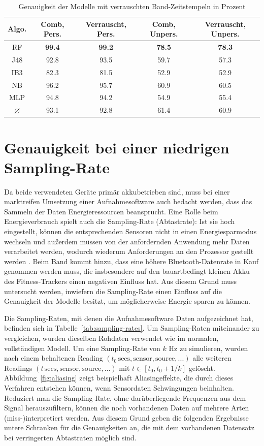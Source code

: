 \begin{table}
\centering
\begin{tabular}{|c|c|c||c|c|}
	\hline 
	\textbf{Algo.} & \textbf{Comb, Pers.} & \textbf{Verrauscht, Pers.} &\textbf{Comb, Unpers.} & \textbf{Verrauscht, Unpers.} \\ 
	\hline 
	\acs{RF} & \textbf{99.4} & \textbf{99.2} & \textbf{78.5} & \textbf{78.3} \\ 
	\acs{J48} & 92.8 & 93.5 & 59.7 & 57.3 \\ 
	\acs{IB}3 & 82.3 & 81.5 & 52.9 & 52.9 \\ 
	\acs{NB} & 96.2 & 95.7 & 60.9 & 60.5 \\ 
	\acs{MLP} & 94.8 & 94.2 & 54.9 & 55.4 \\ 
	\hline 
	$\varnothing$ & 93.1 & 92.8 & 61.4 & 60.9 \\ 
	\hline
\end{tabular} 
\caption{Genauigkeit der Modelle mit verrauschten Band-Zeitstempeln in Prozent}
\label{tab:accuracy-noisy_timestamps}
\end{table}

\section{Genauigkeit bei einer niedrigen Sampling-Rate}
\label{sec:lower-sampling-rate}
Da beide verwendeten Geräte primär akkubetrieben sind, muss bei einer marktreifen Umsetzung einer Aufnahmesoftware auch bedacht werden, dass das Sammeln der Daten Energieressourcen beansprucht. Eine Rolle beim Energieverbrauch spielt auch die Sampling-Rate (Abtastrate): Ist sie hoch eingestellt, können die entsprechenden Sensoren nicht in einen Energiesparmodus wechseln und außerdem müssen von der anfordernden Anwendung mehr Daten verarbeitet werden, wodurch wiederum Anforderungen an den Prozessor gestellt werden \cite{Krause2005}. Beim Band kommt hinzu, dass eine höhere Bluetooth-Datenrate in Kauf genommen werden muss, die insbesondere auf den bauartbedingt kleinen Akku des Fitness-Trackers einen negativen Einfluss hat. Aus diesem Grund muss untersucht werden, inwiefern die Sampling-Rate einen Einfluss auf die Genauigkeit der Modelle besitzt, um möglicherweise Energie sparen zu können.

Die Sampling-Raten, mit denen die Aufnahmesoftware Daten aufgezeichnet hat, befinden sich in Tabelle~\ref{tab:sampling-rates}. Um Sampling-Raten miteinander zu vergleichen, wurden dieselben Rohdaten verwendet wie im normalen, vollständigen Modell. Um eine Sampling-Rate von $k$ Hz zu simulieren, wurden nach einem behaltenen Reading $(t_0\,\text{secs}, \text{sensor}, \text{source}, ...)$ alle weiteren Readings $(t\,\text{secs}, \text{sensor}, \text{source}, ...)$ mit $t \in [t_0, t_0 + 1/k]$ gelöscht. Abbildung~\ref{fig:aliasing} zeigt beispielhaft Aliasingeffekte, die durch dieses Verfahren entstehen können, wenn Sensordaten Schwingungen beinhalten. Reduziert man die Sampling-Rate, ohne darüberliegende Frequenzen aus dem Signal herauszufiltern, können die noch vorhandenen Daten auf mehrere Arten (miss-)interpretiert werden. Aus diesem Grund geben die folgenden Ergebnisse untere Schranken für die Genauigkeiten an, die mit dem vorhandenen Datensatz bei verringerten Abtastraten möglich sind.

